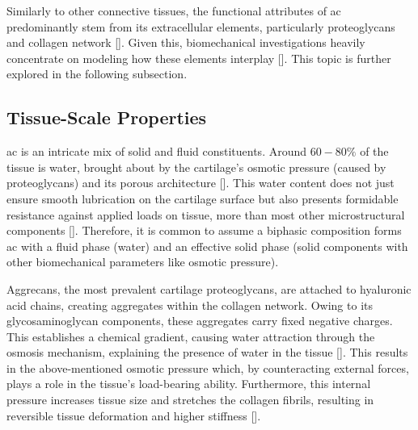 \documentclass[12pt,a4paper]{report}
\begin{document}
Similarly to other connective tissues, the functional attributes of \ac{ac} predominantly stem from its extracellular elements, particularly proteoglycans and collagen network [\cite{culav1999,brody2015}]. Given this, biomechanical investigations heavily concentrate on modeling how these elements interplay [\cite{klika2016,ebrahimi2019,sajjadinia2019,lin2021,paz2022}]. This topic is further explored in the following subsection.

\subsection{Tissue-Scale Properties}
\Ac{ac} is an intricate mix of solid and fluid constituents. Around $60-80\%$ of the tissue is water, brought about by the cartilage's osmotic pressure (caused by proteoglycans) and its porous architecture [\cite{cederlund2022}]. This water content does not just ensure smooth lubrication on the cartilage surface but also presents formidable resistance against applied loads on tissue, more than most other microstructural components [\cite{quiroga2017,sajjadinia2019}]. Therefore, it is common to assume a biphasic composition forms \ac{ac} with a fluid phase (water) and an effective solid phase (solid components with other biomechanical parameters like osmotic pressure).

Aggrecans, the most prevalent cartilage proteoglycans, are attached to hyaluronic acid chains, creating aggregates within the collagen network. Owing to its glycosaminoglycan components, these aggregates carry fixed negative charges. This establishes a chemical gradient, causing water attraction through the osmosis mechanism, explaining the presence of water in the tissue [\cite{kiani2002,gomez2020,johnson2021}]. This results in the above-mentioned osmotic pressure which, by counteracting external forces, plays a role in the tissue's load-bearing ability. Furthermore, this internal pressure increases tissue size and stretches the collagen fibrils, resulting in reversible tissue deformation and higher stiffness [\cite{dudhia2005}].
\end{document}
